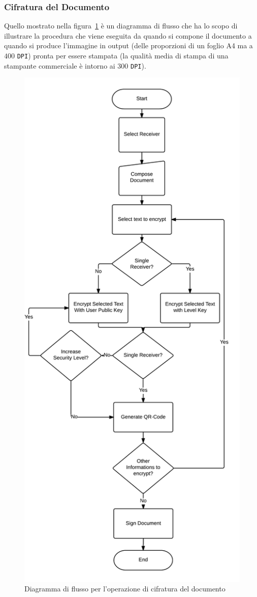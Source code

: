 \subsubsection{Cifratura del Documento}
Quello mostrato nella figura~\ref{fig:cifratura} è un diagramma di flusso che ha lo scopo di illustrare la procedura che viene eseguita da quando si compone il documento a quando si produce l'immagine in output (delle proporzioni di un foglio A4 ma a $400$ \texttt{DPI}) pronta per essere stampata (la qualità media di stampa di una stampante commerciale è intorno ai $300$ \texttt{DPI}).
	\begin{center}	
		\begin{figure}[H]
		\centering
		\includegraphics[scale=0.6]{Immagini/cifratura_vert}
		\caption[Flusso cifratura documento]{Diagramma di flusso per l'operazione di cifratura del documento}
		\label{fig:cifratura}
		\end{figure}
	\end{center}
